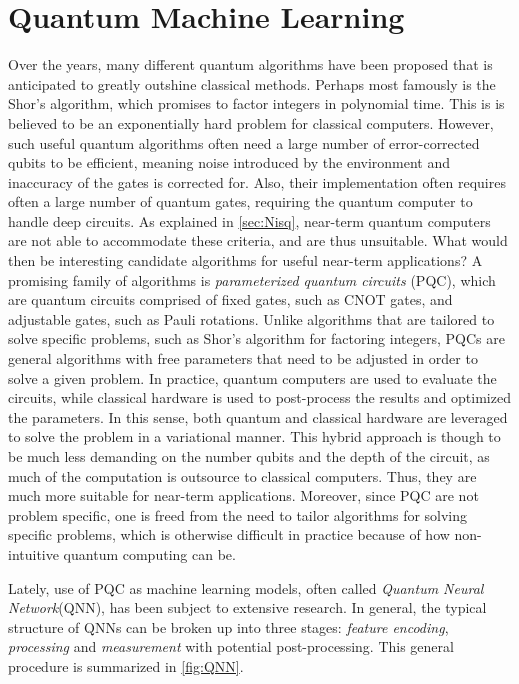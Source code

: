 \chapter{Quantum Machine Learning}\label{chap:QML}
Over the years, many different quantum algorithms have been proposed that is anticipated to greatly outshine classical methods. Perhaps most famously is the Shor's algorithm\cite{Shor_1997}, which promises to factor integers in polynomial time. This is is believed to be an exponentially hard problem for classical computers. However, such useful quantum algorithms often need a large number of error-corrected qubits to be efficient, meaning noise introduced by the environment and inaccuracy of the gates is corrected for. Also, their implementation often requires often a large number of quantum gates, requiring the quantum computer to handle deep circuits. As explained in \autoref{sec:Nisq}, near-term quantum computers are not able to accommodate these criteria, and are thus unsuitable. What would then be interesting candidate algorithms for useful near-term applications? A promising family of algorithms is \emph{parameterized quantum circuits} (PQC), which are quantum circuits comprised of fixed gates, such as CNOT gates, and adjustable gates, such as Pauli rotations\cite{Benedetti_2019}. Unlike algorithms that are tailored to solve specific problems, such as Shor's algorithm for factoring integers, PQCs are general algorithms with free parameters that need to be adjusted in order to solve a given problem. In practice, quantum computers are used to evaluate the circuits, while classical hardware is used to post-process the results and optimized the parameters. In this sense, both quantum and classical hardware are leveraged to solve the problem in a variational manner. This hybrid approach is though to be much less demanding on the number qubits and the depth of the circuit, as much of the computation is outsource to classical computers\cite{Cerezo_2021}. Thus, they are much more suitable for near-term applications. Moreover, since PQC are not problem specific, one is freed from the need to tailor algorithms for solving specific problems, which is otherwise difficult in practice because of how non-intuitive quantum computing can be. 

Lately, use of PQC as machine learning models, often called \emph{Quantum Neural Network}(QNN), has been subject to extensive research\cite{abbas2020power, Benedetti_2019}. In general, the typical structure of QNNs can be broken up into three stages: \emph{feature encoding}, \emph{processing} and \emph{measurement} with potential post-processing. This general procedure is summarized in \autoref{fig:QNN}.

